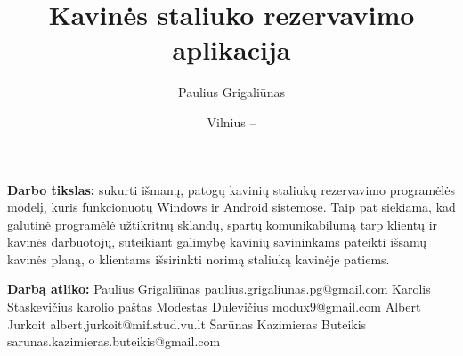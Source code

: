 \documentclass{VUMIFPSkursinis}
\title{Kavinės staliuko rezervavimo aplikacija}
\author{Paulius Grigaliūnas}
\date{Vilnius – \the\year}
\begin{document}
	
\maketitle
\cleardoublepage{}
\setcounter{page}{2}



{\bfseries Darbo tikslas:} sukurti išmanų, patogų kavinių staliukų rezervavimo programėlės modelį, kuris funkcionuotų Windows ir Android sistemose. Taip pat siekiama, kad galutinė programėlė užtikritnų sklandų, spartų komunikabilumą tarp klientų ir kavinės darbuotojų, suteikiant galimybę kavinių savininkams pateikti išsamų kavinės planą, o klientams išsirinkti norimą staliuką kavinėje patiems. 
\newline
\newline
\newline


{\bfseries Darbą atliko:}
\newline
\newline
\newline
Paulius Grigaliūnas
\newline
paulius.grigaliunas.pg@gmail.com
\newline
\newline
\newline
Karolis Staskevičius
\newline
karolio paštas
\newline
\newline
\newline
Modestas Dulevičius
\newline
modux9@gmail.com
\newline
\newline
\newline
Albert Jurkoit
\newline
albert.jurkoit@mif.stud.vu.lt
\newline
\newline
\newline
Šarūnas Kazimieras Buteikis
\newline
sarunas.kazimieras.buteikis@gmail.com


\tableofcontents

\end{document}
